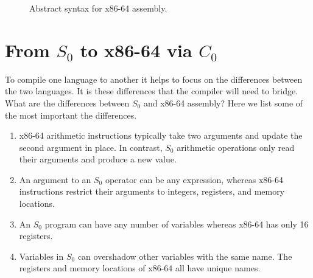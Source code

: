 \documentclass[12pt]{book}
\newcommand{\itm}[1]{\ensuremath{\mathit{#1}}}
\newcommand{\Instr}{\itm{instr}}
\newcommand{\Prog}{\itm{prog}}
\newcommand{\Arg}{\itm{arg}}
\newcommand{\Int}{\itm{int}}
\newcommand{\key}[1]{\texttt{#1}}
\newcommand{\INT}[1]{(\key{int}\;#1)}
\newcommand{\REG}[1]{(\key{reg}\;#1)}
\newcommand{\STACKLOC}[1]{(\key{stack}\;#1)}
\begin{document}
\begin{figure}[tbp]
\fbox{
\begin{minipage}{0.96\textwidth}
\vspace{-10pt}
\[
\begin{array}{lcl}
\Arg &::=&  \INT{\Int} \mid \REG{\itm{register}}
    \mid \STACKLOC{\Int} \\ 
\Instr &::=& (\key{add} \; \Arg\; \Arg) \mid 
      (\key{sub} \; \Arg\; \Arg) \mid 
      (\key{imul} \; \Arg\;\Arg) \mid 
      (\key{neg} \; \Arg) \mid \\
  && (\key{mov} \; \Arg\; \Arg) \mid 
      (\key{call} \; \mathit{label}) \mid
      (\key{push}\;\Arg) \mid (\key{pop}\;\Arg) \mid (\key{ret}) \\
\Prog &::= & (\key{program} \;\itm{info} \; \Instr^{+})
\end{array}
\]
\end{minipage}
}
\caption{Abstract syntax for x86-64 assembly.}
\label{fig:x86-ast-a}
\end{figure}

\section{From $S_0$ to x86-64 via $C_0$}
\label{sec:plan-s0-x86}

To compile one language to another it helps to focus on the
differences between the two languages. It is these differences that
the compiler will need to bridge. What are the differences between
$S_0$ and x86-64 assembly? Here we list some of the most important the
differences.

\begin{enumerate}
\item x86-64 arithmetic instructions typically take two arguments and
  update the second argument in place. In contrast, $S_0$ arithmetic
  operations only read their arguments and produce a new value.

\item An argument to an $S_0$ operator can be any expression, whereas
  x86-64 instructions restrict their arguments to integers, registers,
  and memory locations.

\item An $S_0$ program can have any number of variables whereas x86-64
  has only 16 registers.

\item Variables in $S_0$ can overshadow other variables with the same
  name. The registers and memory locations of x86-64 all have unique
  names.
\end{enumerate}
\end{document}
